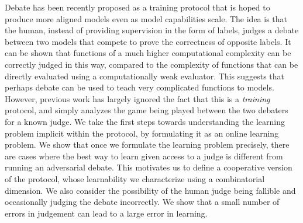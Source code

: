 Debate has been recently proposed as a training protocol that is hoped to
produce more aligned models even as model capabilities scale. The idea is
that the human, instead of providing supervision in the form of labels,
judges a debate between two models that compete to prove the correctness of
opposite labels. It can be shown that functions of a much higher computational complexity  can be
correctly judged in this way, compared to the complexity of functions that can be directly evaluated using a computationally weak evaluator. This suggests that perhaps debate can be
used to teach very complicated functions to models. However, previous work
has largely ignored the fact that this is a \emph{training} protocol, and
simply analyzes the game being played between the two debaters for a known
judge. We take the first steps towards understanding the learning problem
implicit within the protocol, by formulating it as an online learning
problem. We show that once we formulate the learning problem precisely,
there are cases where the best way to learn given access to a judge is
different from running an adversarial debate. This motivates us to define a
cooperative version of the protocol, whose learnability we characterize
using a combinatorial dimension. We also consider the possibility of the
human judge being fallible and occasionally judging the debate incorrectly.
We show that a small number of errors in judgement can lead to a large error
in learning.
